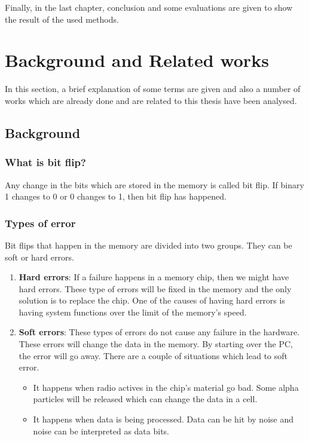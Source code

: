 \documentclass{report}
\begin{document}
Finally, in the last chapter, conclusion and some evaluations are given to show the result of the used methods. 

\chapter{Background and Related works}

In this section, a brief explanation of some terms are given and also a number of works which are already done and are related to this thesis have been analysed.

\section{Background}

\subsection{What is bit flip?}

Any change in the bits which are stored in the memory is called bit flip. If binary 1 changes to 0 or 0 changes to 1, then bit flip has happened.

\subsection{Types of error}

Bit flips that happen in the memory are divided into two groups. They can be soft or hard errors.

\begin{enumerate}

\item \textbf{Hard errors}: If a failure happens in a memory chip, then we might have hard errors. These type of errors will be fixed in the memory and the only solution is to replace the chip. One of the causes of having hard errors is having system functions over the limit of the memory's speed. \cite{harderror}

\item \textbf{Soft errors}: These types of errors do not cause any failure in the hardware. These errors will change the data in the memory. By starting over the PC, the error will go away.\cite{softerror} There are a couple of situations which lead to soft error.
\begin{itemize}
\item It happens when radio actives in the chip's material go bad. Some alpha particles will be released which can change the data in a cell.\cite{softerror}
\item It happens when data is being processed. Data can be hit by noise and noise can be interpreted as data bits. \cite{softerror}
\end{itemize}

\end{enumerate}
\end{document}
